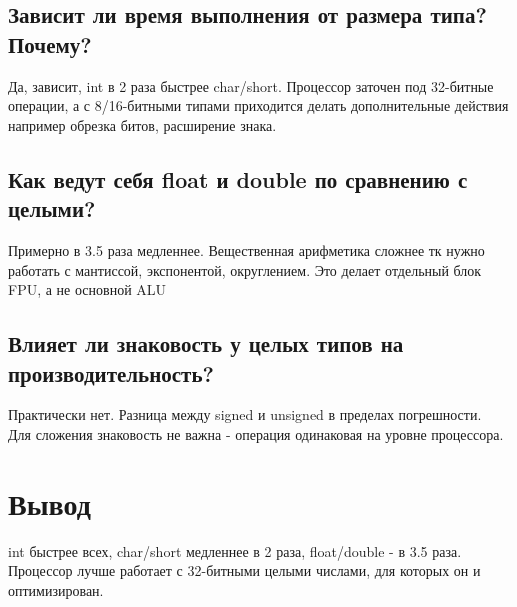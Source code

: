 \documentclass[12pt,a4paper]{article}
\begin{document}
    \subsection*{Зависит ли время выполнения от размера типа? Почему?}
    Да, зависит, int в 2 раза быстрее char/short. Процессор заточен под 32-битные операции, а с 8/16-битными типами приходится делать дополнительные действия например обрезка битов, расширение знака.

    \subsection*{Как ведут себя float и double по сравнению с целыми?}
    Примерно в 3.5 раза медленнее. Вещественная арифметика сложнее тк нужно работать с мантиссой, экспонентой, округлением. Это делает отдельный блок FPU, а не основной ALU

    \subsection*{Влияет ли знаковость у целых типов на производительность?}
    Практически нет. Разница между signed и unsigned в пределах погрешности.\\
    Для сложения знаковость не важна - операция одинаковая на уровне процессора.

    \section*{Вывод}
    int быстрее всех, char/short медленнее в 2 раза, float/double - в 3.5 раза. Процессор лучше работает с 32-битными целыми числами, для которых он и оптимизирован.
\end{document}
